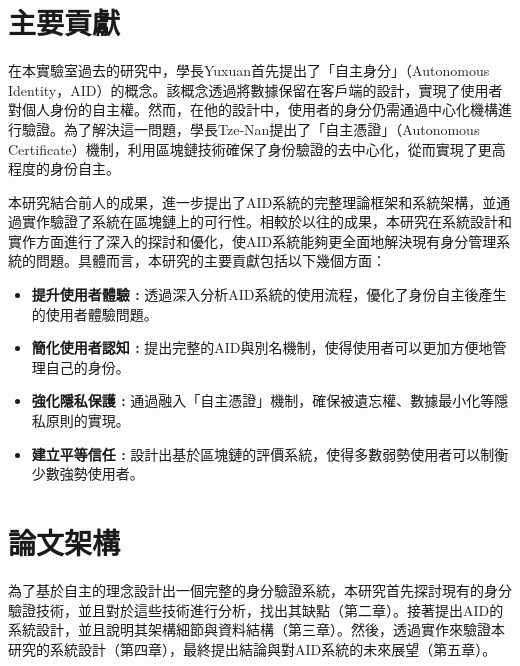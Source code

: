 \section{主要貢獻}
在本實驗室過去的研究中，學長Yuxuan\cite{ntu-lin2014autonomous}首先提出了「自主身分」（Autonomous Identity，AID）的概念。該概念透過將數據保留在客戶端的設計，實現了使用者對個人身份的自主權。然而，在他的設計中，使用者的身分仍需通過中心化機構進行驗證。為了解決這一問題，學長Tze-Nan\cite{NTU202102846}提出了「自主憑證」（Autonomous Certificate）機制，利用區塊鏈技術確保了身份驗證的去中心化，從而實現了更高程度的身份自主。

本研究結合前人的成果，進一步提出了AID系統的完整理論框架和系統架構，並通過實作驗證了系統在區塊鏈上的可行性。相較於以往的成果，本研究在系統設計和實作方面進行了深入的探討和優化，使AID系統能夠更全面地解決現有身分管理系統的問題。具體而言，本研究的主要貢獻包括以下幾個方面：
\begin{itemize}
  \item \textbf{提升使用者體驗 :} 透過深入分析AID系統的使用流程，優化了身份自主後產生的使用者體驗問題。
  \item \textbf{簡化使用者認知 :} 提出完整的AID與別名機制，使得使用者可以更加方便地管理自己的身份。
  \item \textbf{強化隱私保護 :} 通過融入「自主憑證」機制，確保被遺忘權、數據最小化等隱私原則的實現。
  \item \textbf{建立平等信任 :} 設計出基於區塊鏈的評價系統，使得多數弱勢使用者可以制衡少數強勢使用者。
\end{itemize}
\section{論文架構}
為了基於自主的理念設計出一個完整的身分驗證系統，本研究首先探討現有的身分驗證技術，並且對於這些技術進行分析，找出其缺點（第二章）。接著提出AID的系統設計，並且說明其架構細節與資料結構（第三章）。然後，透過實作來驗證本研究的系統設計（第四章），最終提出結論與對AID系統的未來展望（第五章）。